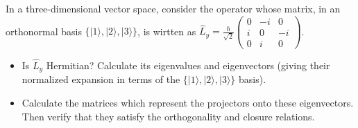 \documentclass[12pt,a4paper]{article}
\newenvironment{problem}[2][Problem]{\begin{trivlist}
\item[\hskip \labelsep {\bfseries #1}\hskip \labelsep {\bfseries #2.}]}{\end{trivlist}}
\begin{document}
\begin{problem}{2}
[C-T Exercise 2-2] In a three-dimensional vector space, consider the operator whose matrix, in an orthonormal basis $\{|1\rangle,|2\rangle,|3\rangle\}$, is wirtten as $\hat{L}_y=\frac{\hbar}{\sqrt{2}}\left(\begin{array}{ccc}0&-i&0\\i&0&-i\\0&i&0\end{array}\right)$.
\begin{itemize}
\item[(a)] Is $\hat{L}_y$ Hermitian? Calculate its eigenvalues and eigenvectors (giving their normalized expansion in terms of the $\{|1\rangle,|2\rangle,|3\rangle\}$ basis).
\item[(b)]  Calculate the matrices which represent the projectors onto these eigenvectors. Then verify that they satisfy the orthogonality and closure relations.
\end{itemize}
\end{problem}
\end{document}
